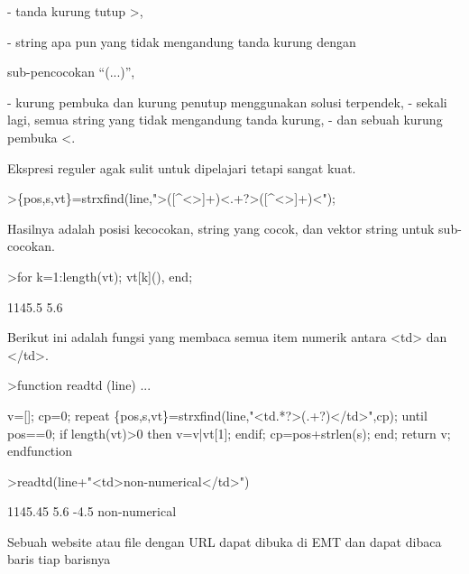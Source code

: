 \documentclass{article}
\begin{document}
\begin{eulernotebook}
\begin{eulercomment}
- tanda kurung tutup \textgreater{},\\
\end{eulercomment}
\begin{eulerttcomment}
 - string apa pun yang tidak mengandung tanda kurung dengan
\end{eulerttcomment}
\begin{eulercomment}
sub-pencocokan “(...)”,\\
\end{eulercomment}
\begin{eulerttcomment}
 - kurung pembuka dan kurung penutup menggunakan solusi terpendek,
 - sekali lagi, semua string yang tidak mengandung tanda kurung,
 - dan sebuah kurung pembuka <.
\end{eulerttcomment}
\begin{eulercomment}

Ekspresi reguler agak sulit untuk dipelajari tetapi sangat kuat.
\end{eulercomment}
\begin{eulerprompt}
>\{pos,s,vt\}=strxfind(line,">([^<>]+)<.+?>([^<>]+)<");
\end{eulerprompt}
\begin{eulercomment}
Hasilnya adalah posisi kecocokan, string yang cocok, dan vektor string
untuk sub-cocokan.
\end{eulercomment}
\begin{eulerprompt}
>for k=1:length(vt); vt[k](), end;
\end{eulerprompt}
\begin{euleroutput}
  1145.5
  5.6
\end{euleroutput}
\begin{eulercomment}
Berikut ini adalah fungsi yang membaca semua item numerik antara \textless{}td\textgreater{}
dan \textless{}/td\textgreater{}.
\end{eulercomment}
\begin{eulerprompt}
>function readtd (line) ...
\end{eulerprompt}
\begin{eulerudf}
  v=[]; cp=0;
  repeat
     \{pos,s,vt\}=strxfind(line,"<td.*?>(.+?)</td>",cp);
     until pos==0;
     if length(vt)>0 then v=v|vt[1]; endif;
     cp=pos+strlen(s);
  end;
  return v;
  endfunction
\end{eulerudf}
\begin{eulerprompt}
>readtd(line+"<td>non-numerical</td>")
\end{eulerprompt}
\begin{euleroutput}
  1145.45
  5.6
  -4.5
  non-numerical
\end{euleroutput}
\begin{eulercomment}
Sebuah website atau file dengan URL dapat dibuka di EMT dan dapat
dibaca baris tiap barisnya


\end{eulercomment}
\end{eulernotebook}
\end{document}
